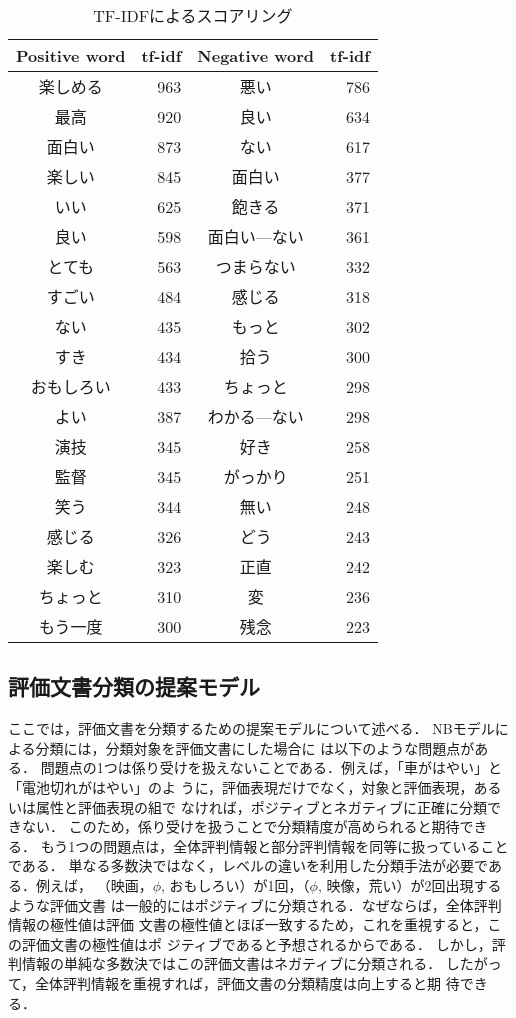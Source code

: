 \documentclass[japanese]{jnlp_1.3c}
\begin{document}
\begin{table}[t]
  \caption{TF-IDFによるスコアリング}
  \label{fig:3.4}
\begin{center}
\begin{tabular}{|c|r|c|r|}
\hline
Positive word & tf-idf  & Negative word & tf-idf \\ \hline
楽しめる& 963 & 悪い&786 \\ \hline
最高& 920 & 良い&634 \\ \hline
面白い& 873 & ない&617 \\ \hline
楽しい& 845 & 面白い&377 \\ \hline
いい& 625 & 飽きる&371 \\ \hline
良い& 598 & 面白い—ない&361 \\ \hline
とても& 563 & つまらない&332 \\ \hline
すごい& 484 & 感じる&318 \\ \hline
ない& 435 & もっと&302 \\ \hline
すき& 434 & 拾う&300 \\ \hline
おもしろい& 433 & ちょっと&298 \\ \hline
よい& 387 & わかる—ない&298 \\ \hline
演技& 345 & 好き&258 \\ \hline
監督& 345 & がっかり&251 \\ \hline
笑う& 344 & 無い&248 \\ \hline
感じる& 326 & どう&243 \\ \hline
楽しむ& 323 & 正直&242 \\ \hline
ちょっと& 310 & 変&236 \\ \hline
もう一度& 300 & 残念&223 \\ \hline
\end{tabular}
\end{center}
\end{table}



\subsection{評価文書分類の提案モデル}
ここでは，評価文書を分類するための提案モデルについて述べる．
NBモデルによる分類には，分類対象を評価文書にした場合に
は以下のような問題点がある．
問題点の1つは係り受けを扱えないことである．例えば，「車がはやい」と
「電池切れがはやい」のよ
うに，評価表現だけでなく，対象と評価表現，あるいは属性と評価表現の組で
なければ，ポジティブとネガティブに正確に分類できない．
このため，係り受けを扱うことで分類精度が高められると期待できる．
もう1つの問題点は，全体評判情報と部分評判情報を同等に扱っていることである．
単なる多数決ではなく，レベルの違いを利用した分類手法が必要である．例えば，
（映画，$\phi$, おもしろい）が1回，（$\phi$, 映像，荒い）が2回出現するような評価文書
は一般的にはポジティブに分類される．なぜならば，全体評判情報の極性値は評価
文書の極性値とほぼ一致するため，これを重視すると，この評価文書の極性値はポ
ジティブであると予想されるからである．
しかし，評判情報の単純な多数決ではこの評価文書はネガティブに分類される．
したがって，全体評判情報を重視すれば，評価文書の分類精度は向上すると期
待できる．
\end{document}

